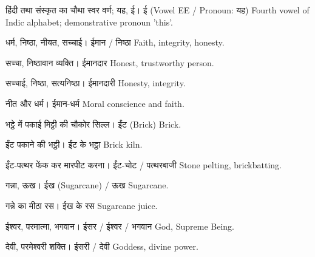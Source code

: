 
%
{हिंदी तथा संस्कृत का चौथा स्वर वर्ण; यह, ई।}%
{ई (Vowel EE / Pronoun: यह)}%
{Fourth vowel of Indic alphabet; demonstrative pronoun 'this'.}

%
{धर्म, निष्ठा, नीयत, सच्चाई।}%
{ईमान / निष्ठा}%
{Faith, integrity, honesty.}

%
{सच्चा, निष्ठावान व्यक्ति।}%
{ईमानदार}%
{Honest, trustworthy person.}

%
{सच्चाई, निष्ठा, सत्यनिष्ठा।}%
{ईमानदारी}%
{Honesty, integrity.}

%
{नीत और धर्म।}%
{ईमान-धर्म}%
{Moral conscience and faith.}

%
{भट्ठे में पकाई मिट्टी की चौकोर सिल्ल।}%
{ईंट (Brick)}%
{Brick.}

%
{ईंट पकाने की भट्ठी।}%
{ईंट के भट्ठा}%
{Brick kiln.}

%
{ईंट-पत्थर फेंक कर मारपीट करना।}%
{ईंट-चोट / पत्थरबाजी}%
{Stone pelting, brickbatting.}

%
{गन्ना, ऊख।}%
{ईख (Sugarcane) / ऊख}%
{Sugarcane.}

%
{गन्ने का मीठा रस।}%
{ईख के रस}%
{Sugarcane juice.}

%
{ईश्वर, परमात्मा, भगवान।}%
{ईसर / ईश्वर / भगवान}%
{God, Supreme Being.}

%
{देवी, परमेश्वरी शक्ति।}%
{ईसरी / देवी}%
{Goddess, divine power.}

